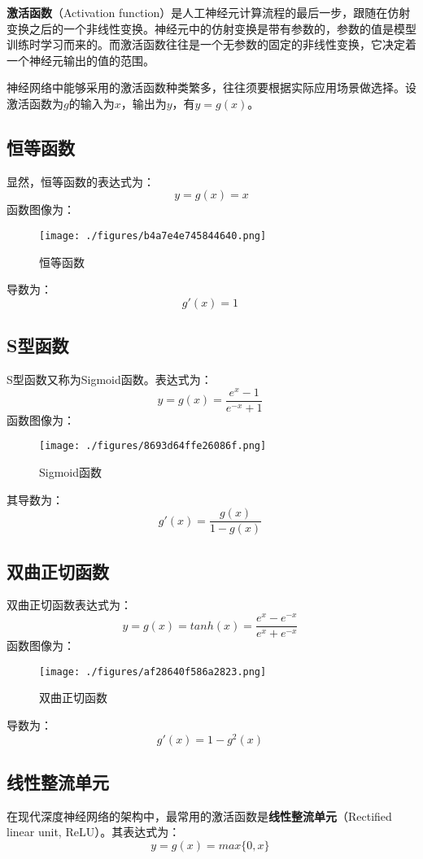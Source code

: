 
\textbf{激活函数}（Activation function）是人工神经元计算流程的最后一步，跟随在仿射变换之后的一个非线性变换。神经元中的仿射变换是带有参数的，参数的值是模型训练时学习而来的。而激活函数往往是一个无参数的固定的非线性变换，它决定着一个神经元输出的值的范围。

神经网络中能够采用的激活函数种类繁多，往往须要根据实际应用场景做选择。设激活函数为$g$的输入为$x$，输出为$y$，有$y=g(x)$。


\subsection{恒等函数}
显然，恒等函数的表达式为：
\begin{equation}
y=g(x)=x
\end{equation}
函数图像为：
\begin{figure}[ht]
\centering
\texttt{[image: ./figures/b4a7e4e745844640.png]}
\caption{恒等函数} \label{fig_ActFun}
\end{figure}
导数为：
\begin{equation}
g'(x)=1~
\end{equation}

\subsection{S型函数}
S型函数又称为Sigmoid函数。表达式为：
\begin{equation}
y=g(x)=\frac{e^x-1}{e^{-x}+1}~
\end{equation}
函数图像为：
\begin{figure}[ht]
\centering
\texttt{[image: ./figures/8693d64ffe26086f.png]}
\caption{Sigmoid函数} \label{fig_ActFun2}
\end{figure}
其导数为：
\begin{equation}
g'(x)=\frac{g(x)}{1-g(x)}~
\end{equation}

\subsection{双曲正切函数}
双曲正切函数表达式为：
\begin{equation}
y=g(x)=tanh(x)=\frac{e^x-e^{-x}}{e^x+e^{-x}}~
\end{equation}
函数图像为：
\begin{figure}[ht]
\centering
\texttt{[image: ./figures/af28640f586a2823.png]}
\caption{双曲正切函数} \label{fig_ActFun3}
\end{figure}
导数为：
\begin{equation}
g'(x)=1-g^2(x)~
\end{equation}

\subsection{线性整流单元}
在现代深度神经网络的架构中，最常用的激活函数是\textbf{线性整流单元}（Rectified linear unit, ReLU）。其表达式为：
\begin{equation}
y=g(x)=max\{0,x\}~
\end{equation}
